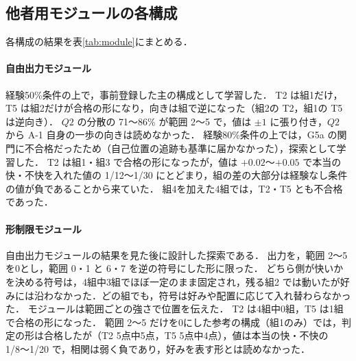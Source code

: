 \subsection{他者用モジュールの各構成}
各構成の結果を表\ref{tab:module}にまとめる．

\begin{table}[tbp]
  \centering
  \small
  \caption{他者用モジュールの各構成の結果}
  \label{tab:module}
  
\end{table}

\paragraph{自由出力モジュール}
経験50\%条件の上で，事前登録した主の構成として学習した．
T2 は組1だけ，T5 は組2だけが合格の形になり，向きは組で逆になった（組2の T2，組1の T5 は逆向き）．
$Q2$ の分散の 71〜86\% が範囲 2〜5 で，値は $\pm1$ に張り付き，$Q2$ から A-1 自身の一歩の向きは読めなかった．
経験80\%条件の上では，G5a の関門に不合格だったため（自己位置の追跡も基準に届かなかった），探索として学習した．
T2 は組1・組3 で合格の形になったが，値は $+0.02$〜$+0.05$ で本当の快・不快を入れた値の 1/12〜1/30 にとどまり，組の差の大部分は経験なし条件の値が負であることから来ていた．
組4を加えた4組では，T2・T5 とも不合格であった．

\paragraph{形制限モジュール}
自由出力モジュールの結果を見た後に設計した探索である．
出力を，範囲 2〜5 を0とし，範囲 0・1 と 6・7 を逆の符号にした形に限った．
どちら側が快いかを決める符号は，4組中3組でほぼ一定のまま固定され，残る組2 では動いたが好みには沿わなかった．どの組でも，符号は好みや配置に応じて入れ替わらなかった．
モジュールは範囲ごとの強さで位置を伝えた．
T2 は4組中0組，T5 は1組で合格の形になった．
範囲 2〜5 だけを0にした参考の構成（組1のみ）では，判定の形は合格したが（T2 5点中5点，T5 5点中4点），値は本当の快・不快の 1/8〜1/20 で，相関は弱く負であり，好みを表す形とは読めなかった．

